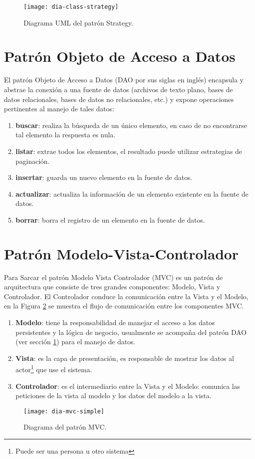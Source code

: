 \begin{figure}[h]
  \centering
  \texttt{[image: dia-class-strategy]}
  \caption{Diagrama UML del patrón Strategy\cite{DesignPatternsLasater}.}
  \label{fig:dia-class-strategy}
\end{figure}

\section{Patrón Objeto de Acceso a Datos}\label{sec-dao}
El patrón Objeto de Acceso a Datos (DAO por sus siglas en inglés) encapsula y abstrae la conexión a una fuente de datos (archivos de texto plano, bases de datos relacionales, bases de datos no relacionales, etc.) y expone operaciones pertinentes al manejo de tales datos\cite{OCPJavaSE7,OCAPJavaSE7}:
\begin{enumerate}
	\item [] \textbf{buscar}: realiza la búsqueda de un único elemento, en caso de no encontrarse tal elemento la respuesta es nula.
	\item [] \textbf{listar}: extrae todos los elementos, el resultado puede utilizar estrategias de paginación.
	\item [] \textbf{insertar}: guarda un nuevo elemento en la fuente de datos.
	\item [] \textbf{actualizar}: actualiza la información de un elemento existente en la fuente de datos.
	\item [] \textbf{borrar}: borra el registro de un elemento en la fuente de datos.
\end{enumerate}


\section{Patrón Modelo-Vista-Controlador}\label{sec-mvc}
Para Sarcar\cite{JavaDesignPatternsExamples} el patrón Modelo Vista Controlador (MVC) es un patrón de arquitectura que consiste de tres grandes componentes: Modelo, Vista y Controlador. El Controlador conduce la comunicación entre la Vista y el Modelo, en la Figura \ref{fig:dia-mvc-simple} se muestra el flujo de comunicación entre los componentes MVC.
\begin{enumerate}
	\item \textbf{Modelo}: tiene la responsabilidad de manejar el acceso a los datos persistentes y la lógica de negocio, usualmente se acompaña del patrón DAO (ver sección \ref{sec-dao}) para el manejo de datos.
	\item \textbf{Vista}: es la capa de presentación, es responsable de mostrar los datos al actor\footnote{Puede ser una persona u otro sistema} que use el sistema.
	\item \textbf{Controlador}: es el intermediario entre la Vista y el Modelo: comunica las peticiones de la vista al modelo y los datos del modelo a la vista.
\end{enumerate}
\begin{figure}[h]
  \centering
  \texttt{[image: dia-mvc-simple]}
  \caption{Diagrama del patrón MVC\cite{JavaDesignPatternsExamples}.}
  \label{fig:dia-mvc-simple}
\end{figure}

